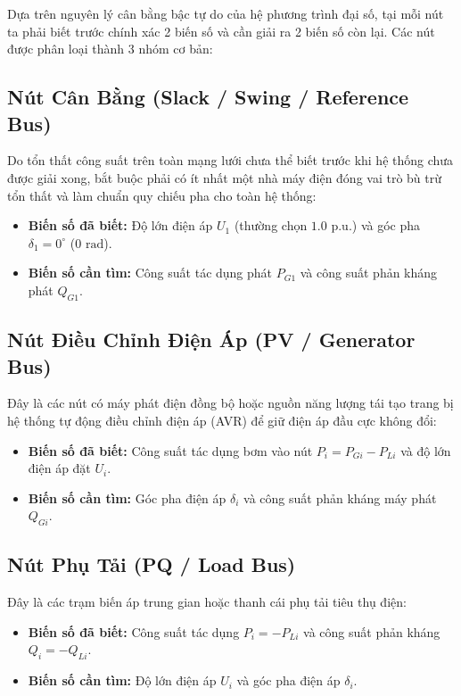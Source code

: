 \documentclass[12pt,a4paper,oneside]{report}
\begin{document}
Dựa trên nguyên lý cân bằng bậc tự do của hệ phương trình đại số, tại mỗi nút ta phải biết trước chính xác 2 biến số và cần giải ra 2 biến số còn lại. Các nút được phân loại thành 3 nhóm cơ bản:

\subsection{Nút Cân Bằng (Slack / Swing / Reference Bus)}
Do tổn thất công suất trên toàn mạng lưới chưa thể biết trước khi hệ thống chưa được giải xong, bắt buộc phải có ít nhất một nhà máy điện đóng vai trò bù trừ tổn thất và làm chuẩn quy chiếu pha cho toàn hệ thống:
\begin{itemize}
    \item \textbf{Biến số đã biết:} Độ lớn điện áp $U_1$ (thường chọn $1.0\text{ p.u.}$) và góc pha $\delta_1 = 0^\circ$ ($0\text{ rad}$).
    \item \textbf{Biến số cần tìm:} Công suất tác dụng phát $P_{G1}$ và công suất phản kháng phát $Q_{G1}$.
\end{itemize}

\subsection{Nút Điều Chỉnh Điện Áp (PV / Generator Bus)}
Đây là các nút có máy phát điện đồng bộ hoặc nguồn năng lượng tái tạo trang bị hệ thống tự động điều chỉnh điện áp (AVR) để giữ điện áp đầu cực không đổi:
\begin{itemize}
    \item \textbf{Biến số đã biết:} Công suất tác dụng bơm vào nút $P_i = P_{Gi} - P_{Li}$ và độ lớn điện áp đặt $U_i$.
    \item \textbf{Biến số cần tìm:} Góc pha điện áp $\delta_i$ và công suất phản kháng máy phát $Q_{Gi}$.
\end{itemize}

\subsection{Nút Phụ Tải (PQ / Load Bus)}
Đây là các trạm biến áp trung gian hoặc thanh cái phụ tải tiêu thụ điện:
\begin{itemize}
    \item \textbf{Biến số đã biết:} Công suất tác dụng $P_i = -P_{Li}$ và công suất phản kháng $Q_i = -Q_{Li}$.
    \item \textbf{Biến số cần tìm:} Độ lớn điện áp $U_i$ và góc pha điện áp $\delta_i$.
\end{itemize}
\end{document}
